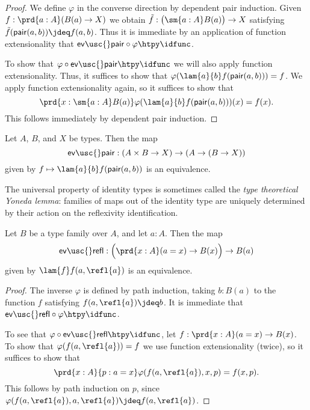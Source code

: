 \begin{proof}
We define $\varphi$ in the converse direction by dependent pair induction.
Given $f:\prd{a:A}(B(a)\to X)$ we obtain $\tilde{f}:\big(\sm{a:A}B(a)\big)\to X$ satisfying $\tilde{f}(\mathsf{pair}(a,b))\jdeq f(a,b)$. Thus it is immediate by an application of function extensionality that $\mathsf{ev\usc{}pair}\circ\varphi\htpy\idfunc$. 

To show that $\varphi\circ\mathsf{ev\usc{}pair}\htpy\idfunc$ we will also apply function extensionality. Thus, it suffices to show that $\varphi(\lam{a}{b}f(\mathsf{pair}(a,b)))=f$. We apply function extensionality again, so it suffices to show that
\begin{equation*}
\prd{x:\sm{a:A}B(a)}\varphi(\lam{a}{b}f(\mathsf{pair}(a,b)))(x)=f(x).
\end{equation*}
This follows immediately by dependent pair induction. 
\end{proof}

\begin{cor}
Let $A$, $B$, and $X$ be types. Then the map
\begin{equation*}
\mathsf{ev\usc{}pair}: (A\times B \to X)\to (A\to (B\to X))
\end{equation*}
given by $f\mapsto\lam{a}{b}f(\mathsf{pair}(a,b))$ is an equivalence.
\end{cor}

The universal property of identity types is sometimes called the \emph{type theoretical Yoneda lemma}: families of maps out of the identity type are uniquely determined by their action on the reflexivity identification.

\begin{thm}\label{thm:yoneda}
Let $B$ be a type family over $A$, and let $a:A$. Then the map
\begin{equation*}
\mathsf{ev\usc{}refl}:\Big(\prd{x:A} (a=x)\to B(x)\Big)\to B(a)
\end{equation*}
given by $\lam{f} f(a,\refl{a})$ is an equivalence. 
\end{thm}

\begin{proof}
The inverse $\varphi$ is defined by path induction, taking $b:B(a)$ to the function $f$ satisfying $f(a,\refl{a})\jdeq b$. It is immediate that $\mathsf{ev\usc{}refl}\circ\varphi\htpy \idfunc$.

To see that $\varphi\circ \mathsf{ev\usc{}refl}\htpy\idfunc$, let $f:\prd{x:A}(a=x)\to B(x)$. To show that $\varphi(f(a,\refl{a}))=f$ we use function extensionality (twice), so it suffices to show that
\begin{equation*}
\prd{x:A}{p:a=x} \varphi(f(a,\refl{a}),x,p)=f(x,p).
\end{equation*}
This follows by path induction on $p$, since $\varphi(f(a,\refl{a}),a,\refl{a})\jdeq f(a,\refl{a})$.
\end{proof}



